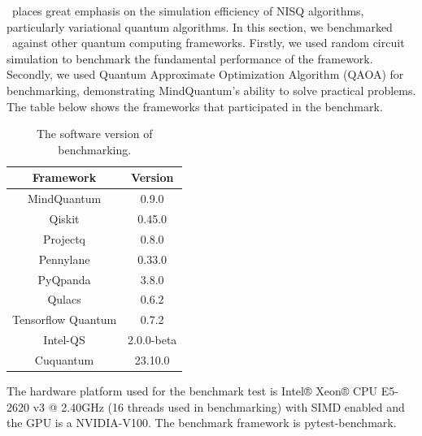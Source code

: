 \MindQuantum\ places great emphasis on the simulation efficiency of NISQ algorithms, particularly variational quantum algorithms. In this section, we benchmarked \MindQuantum\ against other quantum computing frameworks. Firstly, we used random circuit simulation to benchmark the fundamental performance of the framework. Secondly, we used Quantum Approximate Optimization Algorithm (QAOA) for benchmarking, demonstrating MindQuantum's ability to solve practical problems. The table below shows the frameworks that participated in the benchmark.

\begin{table}[ht]
    \begin{tabular}{cc}
        \toprule
        Framework          & Version    \\
        \midrule
        MindQuantum        & 0.9.0      \\
        Qiskit             & 0.45.0     \\
        Projectq           & 0.8.0      \\
        Pennylane          & 0.33.0     \\
        PyQpanda           & 3.8.0      \\
        Qulacs             & 0.6.2      \\
        Tensorflow Quantum & 0.7.2      \\
        Intel-QS           & 2.0.0-beta \\
        Cuquantum          & 23.10.0    \\
        \bottomrule
    \end{tabular}
    \caption{The software version of benchmarking.}
    \label{tab:software version}
\end{table}

The hardware platform used for the benchmark test is Intel® Xeon® CPU E5-2620 v3 @ 2.40GHz (16 threads used in benchmarking) with SIMD enabled and the GPU is a NVIDIA-V100. The benchmark framework is pytest-benchmark.


